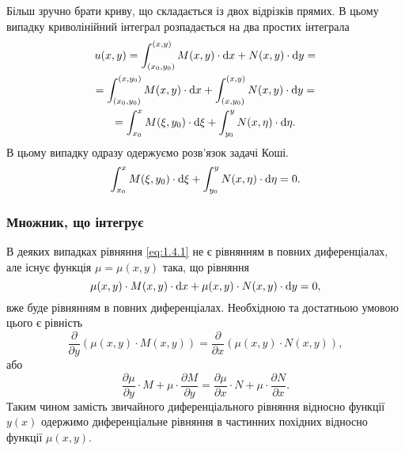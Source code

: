 Більш зручно брати криву, що складається із двох відрізків прямих. В цьому випадку криволінійний інтеграл розпадається на два простих інтеграла
\begin{multline}
	\label{eq:1.4.9}
	u(x, y) = \int_{(x_0, y_0)}^{(x,y)} M(x,y) \cdot \mathop{}\!\mathrm{d} x + N(x, y) \cdot \mathop{}\!\mathrm{d} y = \\
	= \int_{(x_0, y_0)}^{(x,y_0)} M(x,y) \cdot \mathop{}\!\mathrm{d} x + \int_{(x,y_0)}^{(x,y)} N(x, y) \cdot \mathop{}\!\mathrm{d} y = \\
	= \int_{x_0}^{x} M(\xi,y_0) \cdot \mathop{}\!\mathrm{d} \xi + \int_{y_0}^{y} N(x, \eta) \cdot \mathop{}\!\mathrm{d} \eta.
\end{multline}
В цьому випадку одразу одержуємо розв’язок задачі Коші.
\begin{equation}
	\label{eq:1.4.10}
	\int_{x_0}^{x} M(\xi,y_0) \cdot \mathop{}\!\mathrm{d} \xi + \int_{y_0}^{y} N(x, \eta) \cdot \mathop{}\!\mathrm{d} \eta = 0.
\end{equation}

\subsubsection{Множник, що інтегрує}
В деяких випадках рівняння \eqref{eq:1.4.1} не є рівнянням в повних диференціалах, але існує функція $\mu = \mu(x,y)$ така, що рівняння
\begin{equation}
	\label{eq:1.4.11}
	\mu(x,y) \cdot M(x, y) \cdot \mathop{}\!\mathrm{d} x + \mu(x,y) \cdot N(x, y) \cdot \mathop{}\!\mathrm{d} y = 0,
\end{equation}
вже буде рівнянням в повних диференціалах. Необхідною та достатньою умовою цього є рівність
\begin{equation}
	\label{eq:1.4.12}
	\frac{\partial}{\partial y} (\mu(x,y) \cdot M(x, y)) = \frac{\partial}{\partial x} (\mu(x,y) \cdot N(x, y)),
\end{equation}
або
\begin{equation}
	\label{eq:1.4.13}
	\frac{\partial \mu}{\partial y} \cdot M + \mu \cdot \frac{\partial M}{\partial y} = \frac{\partial \mu}{\partial x} \cdot N + \mu \cdot \frac{\partial N}{\partial x}.
\end{equation}
Таким чином замість звичайного диференціального рівняння відносно функції $y(x)$ одержимо диференціальне рівняння в частинних похідних відносно функції $\mu(x, y)$. \\

